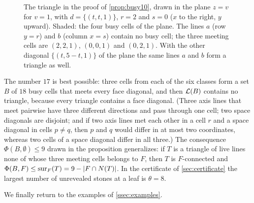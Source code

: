 \begin{figure}[t]
\centering
{}
\caption{The triangle in the proof of \cref{prop:busy10}, drawn in the plane $z=v$ for $v=1$, with
$d=\{(t,t,1)\}$, $r=2$ and $s=0$ ($x$ to the right, $y$ upward). Shaded: the four busy cells of the
plane. The lines $a$ (row $y=r$) and $b$ (column $x=s$) contain no busy cell; the three meeting cells are
$(2,2,1)$, $(0,0,1)$ and $(0,2,1)$. With the other diagonal $\{(t,5-t,1)\}$ of the plane the same lines $a$
and $b$ form a triangle as well.}
\label{fig:triangle}
\end{figure}

The number $17$ is best possible: three cells from each of the six classes form a set $B$ of $18$ busy
cells that meets every face diagonal, and then $\mathcal{L}(B)$ contains no triangle, because every triangle
contains a face diagonal. (Three axis lines that meet pairwise have three different directions and pass
through one cell; two space diagonals are disjoint; and if two axis lines met each other in a cell $r$
and a space diagonal in cells $p\ne q$, then $p$ and $q$ would differ in at most two coordinates, whereas
two cells of a space diagonal differ in all three.) The consequence $\Phi(B,\emptyset)\le 9$ drawn in the
proposition generalizes: if $T$ is a triangle
of live lines none of whose three meeting cells belongs to $F$,
then $T$ is $F$-connected and $\Phi(B,F)\le\operatorname{sur}_F(T)=9-|F\cap N(T)|$. In the certificate of
\cref{sec:certificate} the largest number of unrevealed stones at a leaf is $\theta=8$.

We finally return to the examples of \cref{ssec:examples}.

